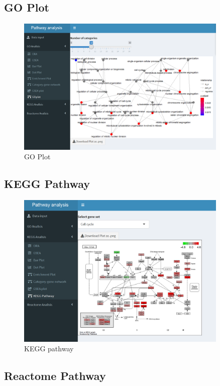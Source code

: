 \subsection{GO Plot}

\begin{figure}[H]
\centering
\includegraphics[width=0.9\textwidth]{figures/App_F19_Items_GO_GOPlot.png} 
\caption{GO Plot}
\end{figure}

\subsection{KEGG Pathway}


\begin{figure}[H]
\centering
\includegraphics[width=0.9\textwidth]{figures/App_F20_Items_KEGG_KEGGPathway.png} 
\caption{KEGG pathway}
\end{figure}

\subsection{Reactome Pathway}

